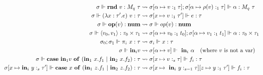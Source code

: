 \begin{figure}
\begin{center}
\begin{equation*}
\begin{aligned}[c]
    \sigma \Vdash \mathbf{rnd} \ v : M_q \ \tau &\rightsquigarrow \sigma [\alpha
    \mapsto v :_1 \tau]; \sigma [\alpha \mapsto \rho(v) :_1 \tau] \Vdash \alpha : M_q
    \ \tau \\
    \sigma \Vdash (\lambda x : \tau' .e) \ v : \tau &\rightsquigarrow \sigma[x
    \mapsto v :_1 \tau'] \Vdash e : \tau \\
    \sigma \Vdash \mathbf{op}(v) : \textbf{num} &\rightsquigarrow \sigma \Vdash op(v) :
    \textbf{num} \\
    \sigma \Vdash \langle v_0,v_1 \rangle : \tau_0 \times \tau_1
    &\rightsquigarrow \sigma[\alpha \mapsto v_0 :_1 t_0]; \sigma[\alpha \mapsto
    v_1 :_1 t_1] \Vdash \alpha : \tau_0 \times \tau_1\\
    \sigma_0; \sigma_1 \Vdash \pi_i \ x : \tau &\rightsquigarrow \sigma_i \Vdash x
    : \tau \\ 
    \sigma \Vdash \textbf{in}_i v &\rightsquigarrow \sigma[\alpha \mapsto v]
    \Vdash \ \textbf{in}_i \ \alpha \quad \text{(where $v$ is not a var)} \\
    \sigma \Vdash \mathbf{case} \ \textbf{in}_1 v \ \mathbf{of} \ (\textbf{in}_1 \ x.f_1 \ | \
    \textbf{in}_2 \ x.f_2 ) : \tau &\rightsquigarrow \sigma[x \mapsto v :_s \tau]
    \Vdash f_i : \tau \\
    \sigma [x \mapsto \textbf{in}_i \ y :_s \tau'] \Vdash \mathbf{case} \ x \ \mathbf{of} \ (\textbf{in}_1 \
    z.f_1 \ | \ \textbf{in}_2 \ z.f_2 ) : \tau &\rightsquigarrow \sigma[x \mapsto \ \textbf{in}_i \ y
    :_{s-1} \tau][z \mapsto y :_1 \tau'] \Vdash f_i : \tau \\ 
  \end{aligned}
\end{equation*}

\end{center}
\end{figure}

